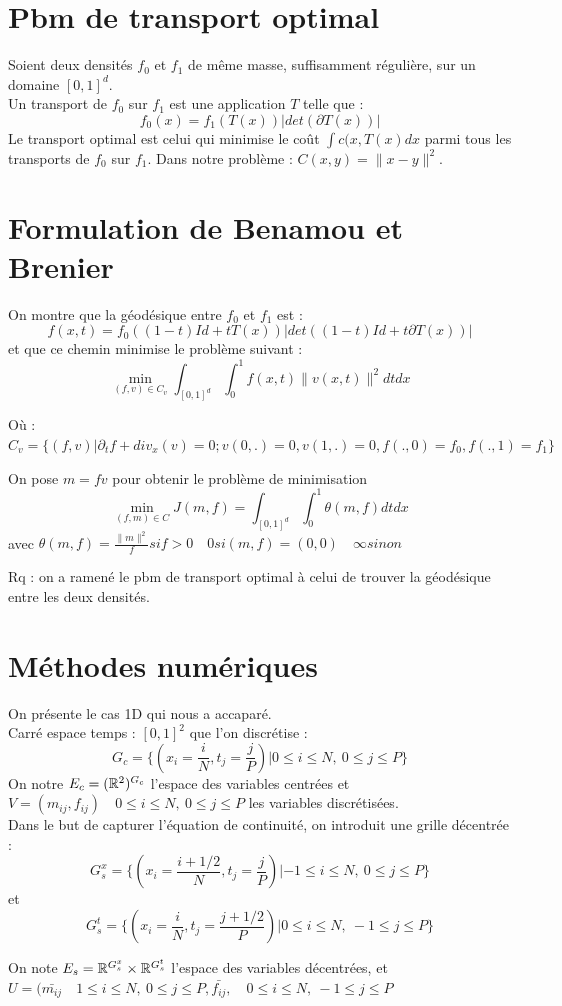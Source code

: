 \documentclass[a4paper,12pt]{article}
\begin{document}
\section{Pbm de transport optimal}
Soient deux densités $f_0$ et $f_1$ de même masse, suffisamment régulière, sur un domaine $[0,1]^d$.\\
Un transport de $f_0$ sur $f_1$ est une application $T$ telle que :
$$
f_0(x)=f_1(T(x))|det(\partial T(x))|
$$
Le transport optimal est celui qui minimise le coût $\int c(x,T(x)dx$ parmi tous les transports de $f_0$ sur $f_1$. Dans notre problème : $C(x,y) =\|x-y\|^2$. 

\section{Formulation de Benamou et Brenier}
On montre que la géodésique entre $f_0$ et $f_1$ est : 
$$
f(x,t)=f_0((1-t)Id+tT(x))|det((1-t)Id+t\partial T(x))|
$$
et que ce chemin minimise le problème suivant : 
$$
\min_{(f,v)\in C_v} \int_{[0,1]^d}\int_0^1 f(x,t)\|v(x,t)\|^2dtdx
$$

Où : $C_v= \{(f,v)|\partial_t f+div_x(v)=0;v(0,.)=0,v(1,.)=0,f(.,0)=f_0,f(.,1)=f_1\}$

On pose $m = fv$ pour obtenir le problème de minimisation 
$$
\min_{(f,m)\in C}J(m,f)=\int_{[0,1]^d}\int_0^1 \theta (m,f)dtdx
$$
avec $\theta (m,f) = \frac{\|m\|^2}{f} si f>0 \quad 0 si (m,f)=(0,0)\quad \infty sinon$

Rq : on a ramené le pbm de transport optimal à celui de trouver la géodésique entre les deux densités. 
\section{Méthodes numériques}
On présente le cas 1D qui nous a accaparé. \\
Carré espace temps : $[0,1]^2$ que l'on discrétise : 
$$
G_c = \{(x_i=\frac{i}{N},t_j=\frac{j}{P})|0\leq i\leq N,\ 0\leq j\leq P\}
$$
On notre $E_c =(\mathbb{R}^2)^{G_c}$ l'espace des variables centrées et $ V=(m_{ij},f_{ij}) \quad 0\leq i\leq N,\ 0\leq j\leq P$ les variables discrétisées. \\

Dans le but de capturer l'équation de continuité, on introduit une grille décentrée : 
$$
G_s^x = \{(x_i=\frac{i+1/2}{N},t_j=\frac{j}{P})|-1\leq i\leq N,\ 0\leq j\leq P\}
$$
et 
$$
G_s^t = \{(x_i=\frac{i}{N},t_j=\frac{j+1/2}{P})|0\leq i\leq N,\ -1\leq j\leq P\}
$$

On note $E_s=\mathbb{R}^{G_s^x}\times\mathbb{R}^{G_s^t}$ l'espace des variables décentrées, et $U=(\bar{m_{ij}}\quad 1\leq i\leq N,\ 0\leq j\leq P,\bar{f_{ij}},\quad 0\leq i\leq N,\ -1\leq j\leq P$
\end{document}
